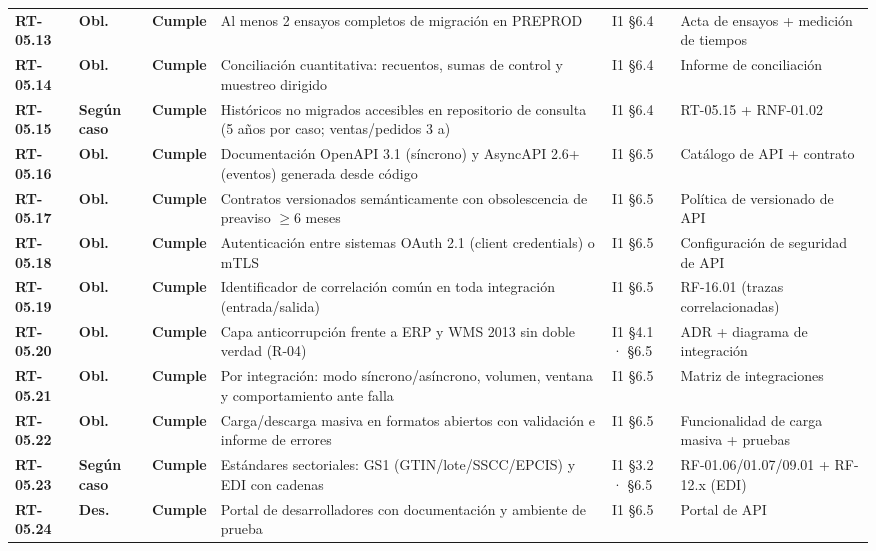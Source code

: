 \begin{small}
\begin{longtable}{@{}p{1.35cm} p{1.15cm} p{1.15cm} p{4.6cm} p{2.35cm} p{3.8cm}@{}}
\textbf{RT-05.13} & \textbf{Obl.} & \textbf{Cumple} & Al menos 2 ensayos completos de migraci\'on en PREPROD & I1 §6.4 & Acta de ensayos + medici\'on de tiempos \\
\textbf{RT-05.14} & \textbf{Obl.} & \textbf{Cumple} & Conciliaci\'on cuantitativa: recuentos, sumas de control y muestreo dirigido & I1 §6.4 & Informe de conciliaci\'on \\
\textbf{RT-05.15} & \textbf{Según caso} & \textbf{Cumple} & Hist\'oricos no migrados accesibles en repositorio de consulta (5 a\~nos por caso; ventas/pedidos 3 a) & I1 §6.4 & RT-05.15 + RNF-01.02 \\
\textbf{RT-05.16} & \textbf{Obl.} & \textbf{Cumple} & Documentaci\'on OpenAPI 3.1 (s\'incrono) y AsyncAPI 2.6+ (eventos) generada desde c\'odigo & I1 §6.5 & Cat\'alogo de API + contrato \\
\textbf{RT-05.17} & \textbf{Obl.} & \textbf{Cumple} & Contratos versionados sem\'anticamente con obsolescencia de preaviso $\geq$6 meses & I1 §6.5 & Pol\'itica de versionado de API \\
\textbf{RT-05.18} & \textbf{Obl.} & \textbf{Cumple} & Autenticaci\'on entre sistemas OAuth 2.1 (client credentials) o mTLS & I1 §6.5 & Configuraci\'on de seguridad de API \\
\textbf{RT-05.19} & \textbf{Obl.} & \textbf{Cumple} & Identificador de correlaci\'on com\'un en toda integraci\'on (entrada/salida) & I1 §6.5 & RF-16.01 (trazas correlacionadas) \\
\textbf{RT-05.20} & \textbf{Obl.} & \textbf{Cumple} & Capa anticorrupci\'on frente a ERP y WMS 2013 sin doble verdad (R-04) & I1 §4.1 · §6.5 & ADR + diagrama de integraci\'on \\
\textbf{RT-05.21} & \textbf{Obl.} & \textbf{Cumple} & Por integraci\'on: modo s\'incrono/as\'incrono, volumen, ventana y comportamiento ante falla & I1 §6.5 & Matriz de integraciones \\
\textbf{RT-05.22} & \textbf{Obl.} & \textbf{Cumple} & Carga/descarga masiva en formatos abiertos con validaci\'on e informe de errores & I1 §6.5 & Funcionalidad de carga masiva + pruebas \\
\textbf{RT-05.23} & \textbf{Según caso} & \textbf{Cumple} & Est\'andares sectoriales: GS1 (GTIN/lote/SSCC/EPCIS) y EDI con cadenas & I1 §3.2 · §6.5 & RF-01.06/01.07/09.01 + RF-12.x (EDI) \\
\textbf{RT-05.24} & \textbf{Des.} & \textbf{Cumple} & Portal de desarrolladores con documentaci\'on y ambiente de prueba & I1 §6.5 & Portal de API \\

\end{longtable}
\end{small}
